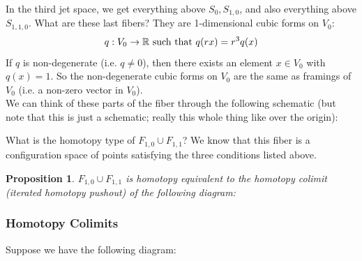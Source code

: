 \documentclass{article}
\newtheorem{proposition}[theorem]{Proposition}
\newtheorem{proposed work}[theorem]{Proposed Work}
\begin{document}
In the third jet space, we get everything above $S_0, S_{1,0}$, and also everything above $S_{1,1,0}$. What are these last fibers? They are 1-dimensional cubic forms on $V_0$: 
$$q:V_0\to \mathbb R \text{ such that } q(rx)=r^3q(x)$$
If $q$ is non-degenerate (i.e. $q\neq 0$), then there exists an element $x\in V_0$ with $q(x)=1$. So the non-degenerate cubic forms on $V_0$ are the same as framings of $V_0$ (i.e. a non-zero vector in $V_0$).\\

We can think of these parts of the fiber through the following schematic (but note that this is just a schematic; really this whole thing like over the origin):\\
\begin{center}
\end{center}

What is the homotopy type of $F_{1,0}\cup F_{1,1}$? We know that this fiber is a configuration space of points satisfying the three conditions listed above.\\

\begin{proposition}\label{F10_F11}
$F_{1,0}\cup F_{1,1}$ is homotopy equivalent to the homotopy colimit (iterated homotopy pushout) of the following diagram:\\
\begin{center}
	\end{center}
\end{proposition}

\subsubsection{Homotopy Colimits}
Suppose we have the following diagram:
\begin{center}
\end{center}
\end{document}
